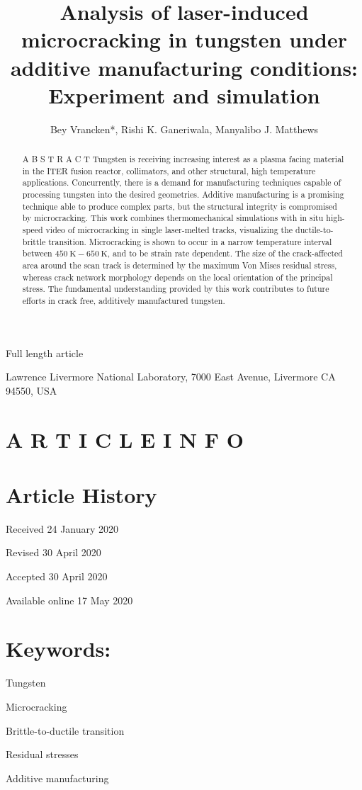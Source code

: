\documentclass[10pt]{article}
\title{Analysis of laser-induced microcracking in tungsten under additive manufacturing conditions: Experiment and simulation }
\author{Bey Vrancken*, Rishi K. Ganeriwala, Manyalibo J. Matthews}
\date{}
\begin{document}
\maketitle
Full length article

Lawrence Livermore National Laboratory, 7000 East Avenue, Livermore CA 94550, USA

\section*{A R T I C L E I N F O}
\section*{Article History}
Received 24 January 2020

Revised 30 April 2020

Accepted 30 April 2020

Available online 17 May 2020

\section*{Keywords:}
Tungsten

Microcracking

Brittle-to-ductile transition

Residual stresses

Additive manufacturing

\begin{abstract}
A B S T R A C T Tungsten is receiving increasing interest as a plasma facing material in the ITER fusion reactor, collimators, and other structural, high temperature applications. Concurrently, there is a demand for manufacturing techniques capable of processing tungsten into the desired geometries. Additive manufacturing is a promising technique able to produce complex parts, but the structural integrity is compromised by microcracking. This work combines thermomechanical simulations with in situ high-speed video of microcracking in single laser-melted tracks, visualizing the ductile-to-brittle transition. Microcracking is shown to occur in a narrow temperature interval between $450 \mathrm{~K}-650 \mathrm{~K}$, and to be strain rate dependent. The size of the crack-affected area around the scan track is determined by the maximum Von Mises residual stress, whereas crack network morphology depends on the local orientation of the principal stress. The fundamental understanding provided by this work contributes to future efforts in crack free, additively manufactured tungsten.
\end{abstract}
\end{document}
